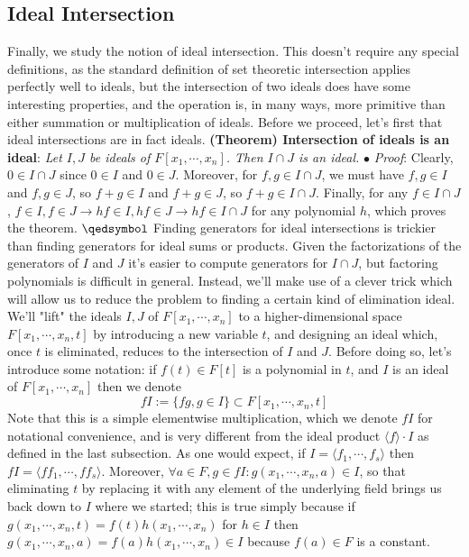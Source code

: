 \documentclass{article}
\newcommand*{\tb}{\textbf}
\newcommand*{\ti}{\textit}
\newcommand*{\n}{\newline}
\newcommand*{\nn}{\newline \newline}
\newcommand*{\Fx}{\ensuremath{F[x_1, \cdots, x_n]}}
\newcommand*{\lfsr}{\langle f_1, \cdots, f_s \rangle}
\begin{document}
\subsection{Ideal Intersection}
Finally, we study the notion of ideal intersection. This doesn't require any special definitions, as the standard definition of set theoretic intersection applies perfectly well to ideals, but the intersection of two ideals does have some interesting properties, and the operation is, in many ways, more primitive than either summation or multiplication of ideals. Before we proceed, let's first that ideal intersections are in fact ideals.
\nn
\tb{(Theorem) Intersection of ideals is an ideal}: \ti{Let $ I, J $ be ideals of $ \Fx $. Then $ I \cap J $ is an ideal.}
\n
\indent $ \bullet $ \ti{Proof}: Clearly, $ 0 \in I \cap J $ since $ 0 \in I $ and $ 0 \in J $. Moreover, for $ f, g \in I \cap J $, we must have $ f, g \in I $ and $ f, g \in J $, so $ f + g \in I $ and $ f + g \in J $, so $ f + g \in I \cap J $. Finally, for any $ f \in I \cap J $, $ f \in I, f \in J \rightarrow h f \in I, h f \in J \rightarrow h f \in I \cap J $ for any polynomial $ h $, which proves the theorem. $ \qedsymbol $
\nn
Finding generators for ideal intersections is trickier than finding generators for ideal sums or products. Given the factorizations of the generators of $ I $ and $ J$ it's easier to compute generators for $ I \cap J $, but factoring polynomials is difficult in general. Instead, we'll make use of a clever trick which will allow us to reduce the problem to finding a certain kind of elimination ideal. We'll "lift" the ideals $ I, J $ of $ \Fx $ to a higher-dimensional space $ F[x_1, \cdots, x_n, t] $ by introducing a new variable $ t $, and designing an ideal which, once $ t $ is eliminated, reduces to the intersection of $ I $ and $ J $. Before doing so, let's introduce some notation: if $ f(t) \in F[t] $ is a polynomial in $ t $, and $ I $ is an ideal of $ \Fx $ then we denote
$$ f I := \{ f g, g \in I \} \subset F[x_1, \cdots, x_n, t] $$
Note that this is a simple elementwise multiplication, which we denote $ f I $ for notational convenience, and is very different from the ideal product $ \langle f \rangle \cdot I $ as defined in the last subsection. As one would expect, if $ I = \lfsr $ then $ f I = \langle f f_1, \cdots, f f_s \rangle $. Moreover, $ \forall a \in F, g \in f I: g(x_1, \cdots, x_n, a) \in I $, so that eliminating $ t $ by replacing it with any element of the underlying field brings us back down to $ I $ where we started; this is true simply because if $ g(x_1, \cdots, x_n, t) = f(t) h(x_1, \cdots, x_n) $ for $ h \in I $ then $ g(x_1, \cdots, x_n, a) = f(a) h(x_1, \cdots, x_n) \in I $ because $ f(a) \in F $ is a constant.
\end{document}
